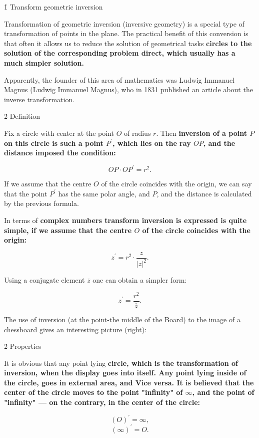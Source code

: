 \h1{ Transform geometric inversion }

Transformation of geometric inversion (inversive geometry) is a special type of transformation of points in the plane. The practical benefit of this conversion is that often it allows us to reduce the solution of geometrical tasks \bf{circles} to the solution of the corresponding problem \bf{direct}, which usually has a much simpler solution.

Apparently, the founder of this area of mathematics was Ludwig Immanuel Magnus (Ludwig Immanuel Magnus), who in 1831 published an article about the inverse transformation.


\h2{ Definition }

Fix a circle with center at the point $O$ of radius $r$. Then \bf{inversion} of a point $P$ on this circle is such a point $P^\prime$, which lies on the ray $OP$, and the distance imposed the condition:

$$ OP \cdot OP^\prime = r^2. $$


If we assume that the centre $O$ of the circle coincides with the origin, we can say that the point $P^\prime$ has the same polar angle, and $P$, and the distance is calculated by the previous formula.

In terms of \bf{complex numbers} transform inversion is expressed is quite simple, if we assume that the centre $O$ of the circle coincides with the origin:

$$ z^\prime = r^2 \cdot \frac{ z }{ |z|^2 }. $$

Using a conjugate element $\overline{z}$ one can obtain a simpler form:

$$ z^\prime = \frac{ r^2 }{ \overline{z} }. $$

The use of inversion (at the point-the middle of the Board) to the image of a chessboard gives an interesting picture (right):



\h2{ Properties }

It is obvious that any point lying \bf{circle}, which is the transformation of inversion, when the display goes into itself. Any point lying \bf{inside} of the circle, goes in \bf{external} area, and Vice versa. It is believed that the center of the circle moves to the point "infinity" of $\infty$, and the point of "infinity" --- on the contrary, in the center of the circle:

$$ (O)^\prime = \infty, $$
$$ (\infty)^\prime = O. $$

